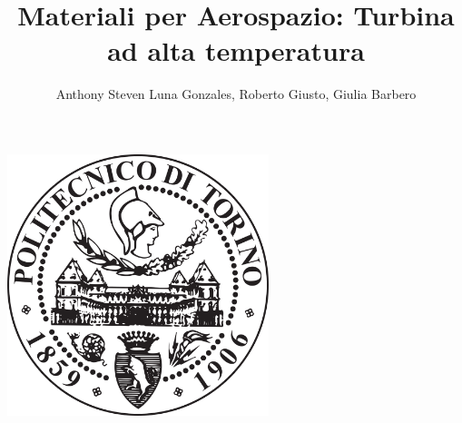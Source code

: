 \documentclass{article}
\author{Anthony Steven Luna Gonzales, Roberto Giusto, Giulia Barbero}
\title{Materiali per Aerospazio: Turbina ad alta temperatura}
\begin{document}
    \maketitle
    \begin{center}
        \includegraphics[width=3in]{Sources/polito_logo.png}
    \end{center}
    
    
\end{document}
